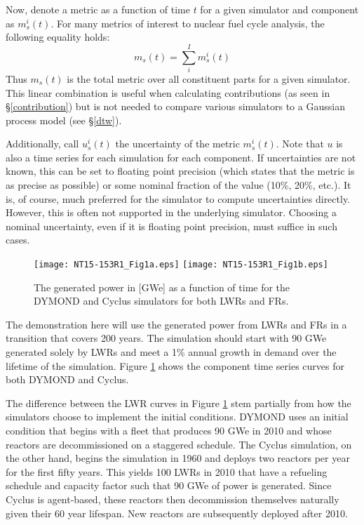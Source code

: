 \documentclass{ntmanuscript}
\begin{document}
Now, denote a metric as a function of time $t$ for a given simulator and
component as $m_s^i(t)$. For many metrics of interest
to nuclear fuel cycle analysis, the following equality holds:
\begin{equation}
m_s(t) = \sum_i^I m_s^i(t)
\end{equation}
Thus $m_s(t)$ is the total metric over all constituent parts for a given
simulator. This linear combination is useful when calculating contributions
(as seen in \S\ref{contribution}) but is not needed to compare various
simulators to a Gaussian process model (see \S\ref{dtw}).

Additionally, call $u_s^i(t)$ the uncertainty of the metric
$m_s^i(t)$. Note that $u$ is also a time series for each simulation for
each component. If uncertainties are not known, this can be set to floating
point precision (which states that the metric is as precise as possible) or
some nominal fraction of the value (10\%, 20\%, etc.). It is, of course,
much preferred for the simulator to compute
uncertainties directly. However, this is often not supported in the underlying
simulator. Choosing a nominal uncertainty, even if it is floating point
precision, must suffice in such cases.

\begin{figure}[htb]
\centering
\texttt{[image: NT15-153R1\_Fig1a.eps]}
\texttt{[image: NT15-153R1\_Fig1b.eps]}
\caption{The generated power in [GWe] as a function of time for the DYMOND and
Cyclus simulators for both LWRs and FRs.}
\label{gwe-simulators}
\end{figure}

The demonstration here will use the generated power from LWRs and FRs in
a transition that covers 200 years. The simulation should start with
90 GWe generated solely by LWRs and meet a 1\% annual growth in demand over the
lifetime of the simulation. Figure \ref{gwe-simulators} shows the component time
series curves for both DYMOND and Cyclus.

The difference between the LWR curves in Figure \ref{gwe-simulators} stem
partially from how the simulators choose to implement the initial conditions.
DYMOND uses an initial condition that
begins with a fleet that produces 90 GWe in 2010 and whose reactors are
decommissioned on a staggered schedule. The Cyclus simulation, on the other
hand, begins the simulation in 1960 and deploys two reactors per year for
the first fifty years. This yields 100 LWRs in 2010 that have a refueling
schedule and capacity factor such that 90 GWe of power is generated. Since
Cyclus is agent-based, these reactors then decommission themselves naturally
given their 60 year lifespan. New reactors are subsequently deployed after
2010.
\end{document}
